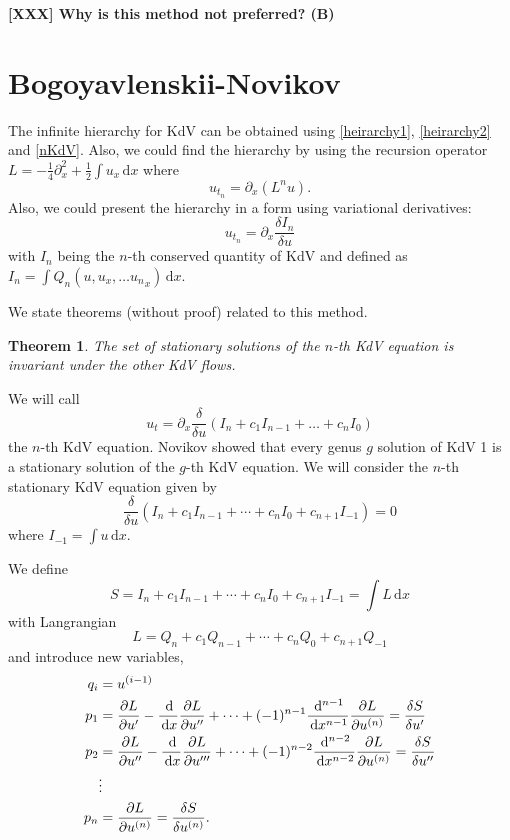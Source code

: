 \documentclass[12pt, a4paper]{article}
\newcommand{\pp}[2]{{\partial #1 \over \partial #2}}
\newcommand{\ud}{\,\mathrm{d}}
\newtheorem{theorem}{Theorem}
\begin{document}
\textbf{[XXX] Why is this method not preferred? (B)}



\section{Bogoyavlenskii-Novikov}
\cite{BN, Decon}



The infinite hierarchy for KdV can be obtained using \eqref{heirarchy1},
\eqref{heirarchy2} and \eqref{nKdV}.  Also, we could find the hierarchy
by using the recursion operator $L = -\tfrac{1}{4} \partial_x^2 +
\tfrac{1}{2} \int u_x \ud x$ where
\[
  u_{t_n} = \partial_x(L^n u).
\]
Also, we could present the hierarchy in a form using variational
derivatives:
\[
  u_{t_n} = \partial_x \frac{\delta I_n}{\delta u}
\]
with $I_n$ being the $n$-th conserved quantity of KdV and defined as
$I_n = \int Q_n(u,u_x,\ldots {u_n}_x) \ud x$.

We state theorems (without proof) related to this method.

\begin{theorem}{\cite{Lax}}
  The set of stationary solutions of the $n$-th KdV equation is
  invariant under the other KdV flows.
\end{theorem}
We will call
\[
  u_t = \partial_x \frac{\delta}{\delta u}
  \left(
  I_n + c_1 I_{n-1} + \ldots + c_n I_0
  \right)
\]
the $n$-th KdV equation. Novikov showed \cite{Nov} that every genus $g$
solution of KdV 1 is a stationary solution of the $g$-th KdV equation.
We will consider the $n$-th stationary KdV equation given by
\[
  \frac{\delta}{\delta u}
  \left(
  I_n + c_1 I_{n-1} + \cdots + c_n I_0 + c_{n+1}I_{-1}
  \right)=0
\]
where $I_{-1}=\int u \ud x$.

We define
\[
  S = I_n + c_1 I_{n-1} + \cdots + c_n I_0 + c_{n+1}I_{-1} =\int L \ud x
\]
with Langrangian
\[
  L = Q_n + c_1Q_{n-1} + \cdots + c_n Q_0 + c_{n+1} Q_{-1}
\]
and introduce new variables,
\begin{align*}
  q_i
  &= u^{(i-1)} \\
  p_1
  &=
  \pp{L}{u'} - \frac{\ud}{\ud x} \pp{L}{u''} +
  \cdots + (-1)^{n-1} \frac{\ud^{n-1}}{\ud x^{n-1}}
  \pp{L}{u^{(n)}}
  =
  \frac{\delta S}{\delta u'} \\
  p_2
  &=
  \pp{L}{u''} - \frac{\ud}{\ud x} \pp{L}{u'''} +
  \cdots + (-1)^{n-2} \frac{\ud^{n-2}}{\ud x^{n-2}}
  \pp{L}{u^{(n)}}
  =
  \frac{\delta S}{\delta u''} \\
  & \vdots \\
  p_n
  &=
  \pp{L}{u^{(n)}}
  =
  \frac{\delta S}{\delta u^{(n)}}.
\end{align*}
\end{document}
